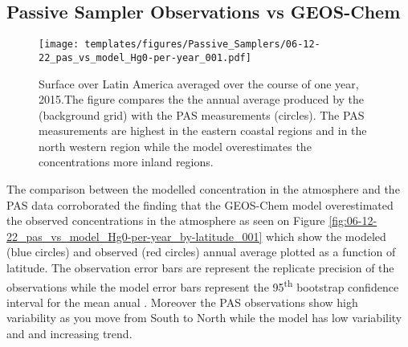 \subsection{Passive Sampler Observations vs GEOS-Chem}
\begin{figure}[H]
  \texttt{[image: templates/figures/Passive\_Samplers/06-12-22\_pas\_vs\_model\_Hg0-per-year\_001.pdf]}
  \caption{Surface \hg over Latin America averaged over the course of one year, 2015.The figure compares the the annual average \hg produced by the \on (background grid) with the PAS measurements (circles). The PAS measurements are highest in the eastern coastal regions and in the north western region while the model overestimates the concentrations more inland regions.}
  \label{fig:06-12-22_pas_vs_model_Hg0-per-year_001}
  \centering
  
\end{figure}
\FloatBarrier

\begin{flushleft}
 The comparison between the modelled concentration in the atmosphere and the PAS data corroborated the finding that the GEOS-Chem model overestimated the observed concentrations in the atmosphere as seen on Figure \ref{fig:06-12-22_pas_vs_model_Hg0-per-year_by-latitude_001} which show the modeled (blue circles) and observed (red circles) annual average \hg plotted as a function of latitude. The observation error bars are represent the replicate precision of the observations while the model error bars represent the 95\textsuperscript{th} bootstrap confidence interval for the mean anual \hg. Moreover the PAS observations show high variability as you move from South to North while the model has low variability and and increasing trend.  
\end{flushleft}


